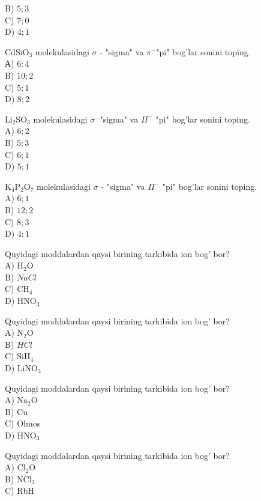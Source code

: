 B) $5 ; 3$\\
C) $7 ; 0$\\
D) $4 ; 1$
  \item $\mathrm{CdSiO}_{3}$ molekulasidagi $\sigma$ - "sigma" va $\pi^{-}$"pi" bog'lar sonini toping.\\
А) $6: 4$\\
B) $10 ; 2$\\
C) $5 ; 1$\\
D) $8 ; 2$
  \item $\mathrm{Li}_{2} \mathrm{SO}_{3}$ molekulasidagi $\sigma^{-}$"sigma" va $\Pi^{-}$ "pi" bog'lar sonini toping.\\
A) $6 ; 2$\\
B) $5 ; 3$\\
C) $6 ; 1$\\
D) $5 ; 1$
  \item $\mathrm{K}_{4} \mathrm{P}_{2} \mathrm{O}_{7}$ molekulasidagi $\sigma$ - "sigma" va $\Pi^{-}$ "pi" bog'lar sonini toping.\\
A) $6 ; 1$\\
B) $12 ; 2$\\
C) $8 ; 3$\\
D) $4: 1$
  \item Quyidagi moddalardan qaysi birining tarkibida ion bog' bor?\\
A) $\mathrm{H}_{2} \mathrm{O}$\\
B) $NaCl$\\
C) $\mathrm{CH}_{4}$\\
D) $\mathrm{HNO}_{3}$
  \item Quyidagi moddalardan qaysi birining tarkibida ion bog' bor?\\
A) $\mathrm{N}_{2} \mathrm{O}$\\
B) $HCl$\\
C) $\mathrm{SiH}_{4}$\\
D) $\mathrm{LiNO}_{3}$
  \item Quyidagi moddalardan qaysi birining tarkibida ion bog' bor?\\
A) $\mathrm{Na}_{2} \mathrm{O}$\\
B) Cu\\
C) Olmos\\
D) $\mathrm{HNO}_{3}$
  \item Quyidagi moddalardan qaysi birining tarkibida ion bog' bor?\\
A) $\mathrm{Cl}_{2} \mathrm{O}$\\
B) $\mathrm{NCl}_{3}$\\
C) RbH\\
